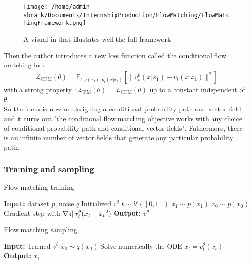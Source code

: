\documentclass{article}
\begin{document}
\begin{figure}[h]
  \centering
  \texttt{[image: /home/admin-sbraik/Documents/InternshipProduction/FlowMatching/FlowMatchingFramework.png]}
  \caption{A visual in \cite{lipman2024flowmatchingguidecode} that illustates well the full framework}
  \label{fig:flow_matching_framework}
\end{figure}

Then the author introduces a new loss function called the conditional flow matching loss
\begin{align}
  \mathcal{L}_\text{CFM}(\theta) = \mathbb{E}_{t,q(x_1),p_t(x|x_1)}\left[\|v_t^\theta(x|x_1)-v_t(x|x_1)\|^2\right]
\end{align}
with a strong property : \(\mathcal{L}_\text{FM}(\theta)=\mathcal{L}_\text{CFM}(\theta)\) up to a constant independent of \(\theta\). \\
So the focus is now on designing a conditional probability path and vector field and it turns out "the conditional flow matching objective works with any choice of conditional probability path and conditional vector fields". Futhermore, there is an infinite number of vector fields that generate any particular probability path.\\

\subsubsection{Training and sampling}

\begin{algorithm}
  \caption{Flow matching training}
      \begin{algorithmic}
          \State \textbf{Input:} dataset \(p\), noise \(q\)
          \State Initialized \(v^\theta\)
              \State \(t\sim\mathcal{U}([0,1])\)
              \State \(x_1\sim p(x_1)\)
              \State \(x_0\sim p(x_0)\)
              \State Gradient step with \(\nabla_\theta \| v_t^\theta (x_t -\dot{x}_t \-^2)\)
          \EndWhile
          \State \textbf{Output:} \(v^\theta\)
      \end{algorithmic}
  \end{algorithm}

\begin{algorithm}[H]
  \caption{Flow matching sampling}\label{alg:flow_matching_sampling}
      \begin{algorithmic}
          \State \textbf{Input:} Trained \(v^\theta\)
          \State \(x_0\sim q(x_0)\)
          \State Solve numerically the ODE \(\dot{x}_t=v_t^\theta(x_t)\)
          \State \textbf{Output:} \(x_1\)
      \end{algorithmic}
\end{algorithm} 
\end{document}
